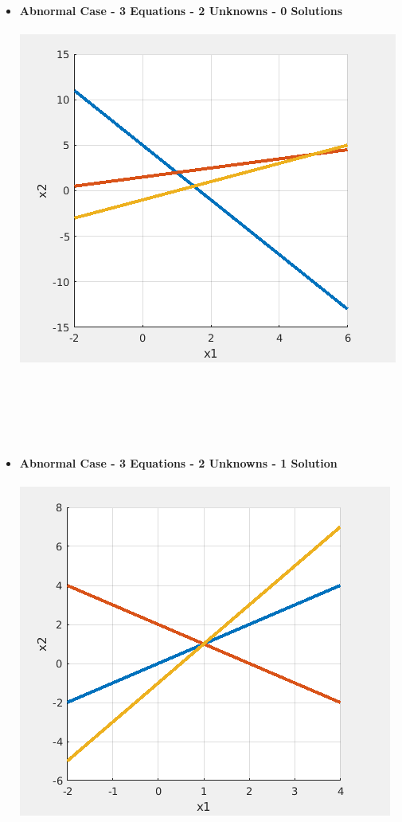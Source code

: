 \documentclass[11pt]{article}
\begin{document}
\begin{itemize}
\begin{itemize}
\newpage
\item {\bf Abnormal Case - 3 Equations - 2 Unknowns - 0 Solutions} \\\\ \includegraphics[scale=1]{lecture5_fig4.png} \\\\
\\\\
\\\\

\newpage
\item {\bf Abnormal Case - 3 Equations - 2 Unknowns - 1 Solution} \\\\ \includegraphics[scale=1]{lecture5_fig5.png} \\\\
\\\\
\\\\
\end{itemize}


\end{itemize}
\end{document}
